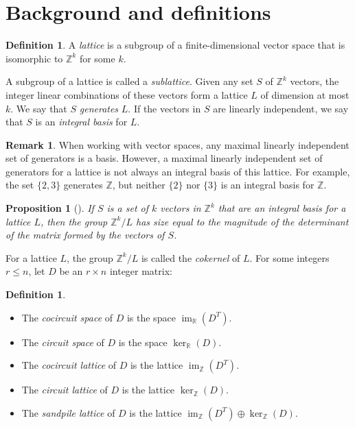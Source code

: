 \documentclass[10pt,a4paper]{amsart}
\newtheorem{prop}[theorem]{Proposition}
\theoremstyle{definition}
\newtheorem{defi}[theorem]{Definition}
\newtheorem{rema}[theorem]{Remark}
\newcommand{\R}{\mathbb{R}}
\newcommand{\Z}{\mathbb{Z}}
\DeclareMathOperator{\Ima}{im}
\begin{document}
\section{Background and definitions}\label{sec:Background}

\begin{defi}
A \emph{lattice} is a subgroup of a finite-dimensional vector space that is isomorphic to $\Z^k$ for some $k$.
\end{defi}

A subgroup of a lattice is called a \emph{sublattice}. Given any set $S$ of $\Z^k$ vectors, the integer linear combinations of these vectors form a lattice $L$ of dimension at most $k$. We say that $S$ \emph{generates} $L$. If the vectors in $S$ are linearly independent, we say that $S$ is an \emph{integral basis} for $L$. 

\begin{rema} When working with vector spaces, any maximal linearly independent set of generators is a basis. However, a maximal linearly independent set of generators for a lattice is not always an integral basis of this lattice. For example, the set $\{2,3\}$ generates $\Z$, but neither $\{2\}$ nor $\{3\}$ is an integral basis for $\Z$. 
\end{rema}

\begin{prop}[{\cite[Theorem~14.5.3]{Godsil}}]\label{cokersize}
If $S$ is a set of $k$ vectors in $\Z^k$ that are an integral basis for a lattice $L$, then the group $\Z^k/ L$ has size equal to the magnitude of the determinant of the matrix formed by the vectors of $S$.
\end{prop}

For a lattice $L$, the group $\Z^k / L$ is called the \emph{cokernel} of $L$. For some integers $r \le n$, let $D$ be an $r \times n$ integer matrix:

\begin{defi}\label{def:cutandflow}\hfill
\begin{itemize}
\item The \emph{cocircuit space} of $D$ is the space $\Ima_\R(D^T)$.
\item The \emph{circuit space} of $D$ is the space $\ker_\R(D)$.
\item The \emph{cocircuit lattice} of $D$ is the lattice $\Ima_\Z(D^T)$.
\item The \emph{circuit lattice} of $D$ is the lattice $\ker_\Z(D)$.
\item The \emph{sandpile lattice} of $D$ is the lattice $\Ima_\Z(D^T) \oplus \ker_\Z(D)$.
\end{itemize}
\end{defi}
\end{document}
